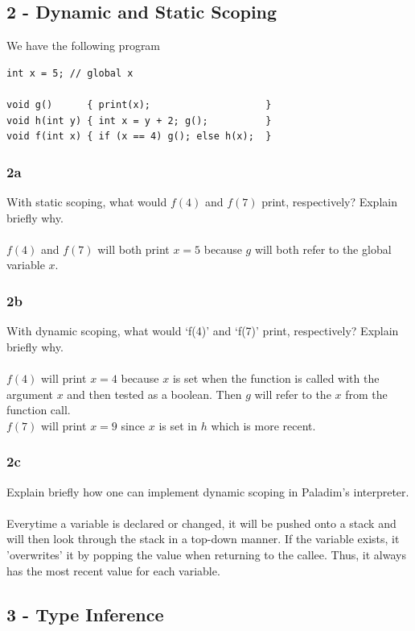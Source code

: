 \documentclass[12pt]{article}
\begin{document}
\newpage

\subsection*{2 - Dynamic and Static Scoping}
We have the following program
\begin{verbatim}
int x = 5; // global x

void g()      { print(x);                    }
void h(int y) { int x = y + 2; g();          }
void f(int x) { if (x == 4) g(); else h(x);  }
\end{verbatim}

\subsubsection*{2a}
With static  scoping, what would $f(4)$ and $f(7)$ print, respectively? Explain briefly why.\\
\\
$f(4)$ and $f(7)$ will both print $x=5$ because $g$ will both refer to the global variable $x$.

\subsubsection*{2b}
With dynamic scoping, what would `f(4)' and `f(7)' print, respectively? Explain briefly why.\\
\\
$f(4)$ will print $x=4$ because $x$ is set when the function is called with the argument $x$ and then tested as a boolean. Then $g$ will refer to the $x$ from the function call.\\
$f(7)$ will print $x=9$ since $x$ is set in $h$ which is more recent.

\subsubsection*{2c}
Explain briefly how one can implement dynamic scoping in Paladim's interpreter.\\
\\
Everytime a variable is declared or changed, it will be pushed onto a stack and will then look through the stack in a top-down manner. If the variable exists, it 'overwrites' it by popping the value when returning to the callee. Thus, it always has the most recent value for each variable.

\subsection*{3 - Type Inference}
\end{document}
